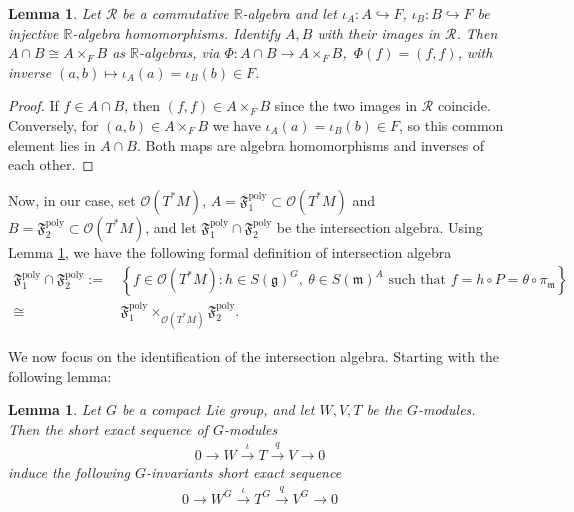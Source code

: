 \documentclass[11pt]{amsart}
\newtheorem{lemma}[theorem]{Lemma}
\theoremstyle{definition}
\theoremstyle{plain}
\theoremstyle{conclusion}
\begin{document}
\begin{lemma} 
\label{lem:interfiber}
Let $\mathcal{R}$ be a commutative $\mathbb{R}$-algebra and let $\iota_A:A\hookrightarrow F$, $\iota_B:B\hookrightarrow F$ be injective $\mathbb{R}$-algebra homomorphisms. Identify $A,B$ with their images in $\mathcal{R}$. Then $A\cap B  \cong  A\times_F B  $ as $\mathbb{R}$-algebras, via $ \Phi:A\cap B\to A\times_F B$, $\,\Phi(f)=(f,f)$, with inverse $(a,b)\mapsto \iota_A(a)=\iota_B(b)\in F$.
\end{lemma}
\begin{proof}
If $f \in A\cap B$, then $(f,f)\in A\times_F B$ since the two images in $\mathcal{R}$ coincide. Conversely, for $(a,b)\in A\times_F B$ we have $\iota_A(a)=\iota_B(b)\in F$, so this common element lies in $A\cap B$. Both maps are algebra homomorphisms and inverses of each other.
\end{proof}

Now, in our case, set $  \mathcal{O}(T^*M)$, $A = \mathfrak{F}_1^{\mathrm{poly}} \subset \mathcal{O}(T^*M)$ and $ B = \mathfrak{F}_2^{\mathrm{poly}} \subset \mathcal{O}(T^*M)$, and let $\mathfrak{F}_1^{\mathrm{poly}} \cap \mathfrak{F}_2^{\mathrm{poly}}   $ be the intersection algebra. Using Lemma \ref{lem:interfiber}, we have the following formal definition of intersection algebra \begin{align}
\nonumber
    \mathfrak{F}_1^{\mathrm{poly}} \cap  \mathfrak{F}_2^{\mathrm{poly}} := & \, \left\{ f\in \mathcal{O}(T^*M): h \in S(\mathfrak{g})^{G}, \ \theta \in S(\mathfrak{m})^A \text{ such that } f = h \circ P = \theta \circ \pi_\mathfrak{m} \right\} \\
    \cong & \, \mathfrak{F}_1^{\mathrm{poly}} \times_{\mathcal{O}(T^*M)} \mathfrak{F}_2^{\mathrm{poly}}. \label{eq:algfirinte}
\end{align} 

We now focus on the identification of the intersection algebra. Starting with the following lemma:

\begin{lemma}
\label{lem:induce} \cite{MR1920389}
    Let $G$ be a compact Lie group, and let $W,V,T$ be the $G$-modules. Then the short exact sequence of $G$-modules \begin{align*}
        0 \longrightarrow W \xrightarrow{\,\iota\,} T \xrightarrow{\,q\,} V \longrightarrow 0
    \end{align*} induce the following $G$-invariants short exact sequence \begin{align*}
                0 \longrightarrow W^G \xrightarrow{\,\iota\,} T^G \xrightarrow{\,q\,} V^G \longrightarrow 0
    \end{align*}
\end{lemma}
\end{document}
